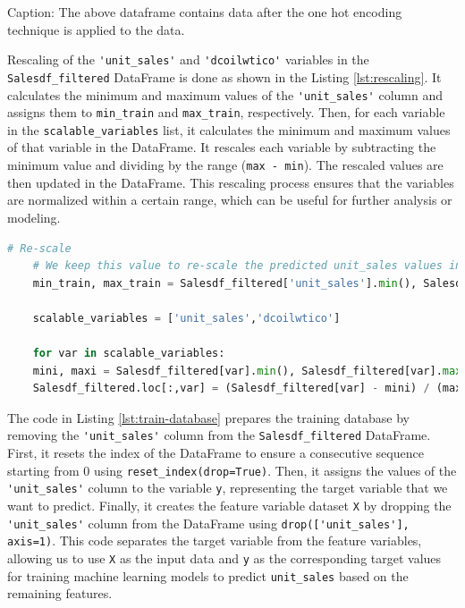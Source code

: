Caption: The above dataframe contains data after the one hot encoding technique is applied to the data.

Rescaling of the \lstinline{'unit_sales'} and \lstinline{'dcoilwtico'} variables in the \lstinline{Salesdf_filtered} DataFrame is done as shown in the Listing \ref{lst:rescaling}. It calculates the minimum and maximum values of the \lstinline{'unit_sales'} column and assigns them to \lstinline{min_train} and \lstinline{max_train}, respectively. Then, for each variable in the \lstinline{scalable_variables} list, it calculates the minimum and maximum values of that variable in the DataFrame. It rescales each variable by subtracting the minimum value and dividing by the range (\lstinline{max - min}). The rescaled values are then updated in the DataFrame. This rescaling process ensures that the variables are normalized within a certain range, which can be useful for further analysis or modeling.


\begin{lstlisting}[language=Python, caption={Re-scaling of variables}, label={lst:rescaling}]
	# Re-scale
	# We keep this value to re-scale the predicted unit_sales values in the following lines of code.
	min_train, max_train = Salesdf_filtered['unit_sales'].min(), Salesdf_filtered['unit_sales'].max()
	
	scalable_variables = ['unit_sales','dcoilwtico']
	
	for var in scalable_variables:
	mini, maxi = Salesdf_filtered[var].min(), Salesdf_filtered[var].max()
	Salesdf_filtered.loc[:,var] = (Salesdf_filtered[var] - mini) / (maxi - mini)
\end{lstlisting}

The code in Listing \ref{lst:train-database} prepares the training database by removing the \lstinline{'unit_sales'} column from the \lstinline{Salesdf_filtered} DataFrame. First, it resets the index of the DataFrame to ensure a consecutive sequence starting from 0 using \lstinline{reset_index(drop=True)}. Then, it assigns the values of the \lstinline{'unit_sales'} column to the variable \lstinline{y}, representing the target variable that we want to predict. Finally, it creates the feature variable dataset \lstinline{X} by dropping the \lstinline{'unit_sales'} column from the DataFrame using \lstinline{drop(['unit_sales'], axis=1)}. This code separates the target variable from the feature variables, allowing us to use \lstinline{X} as the input data and \lstinline{y} as the corresponding target values for training machine learning models to predict \lstinline{unit_sales} based on the remaining features.




